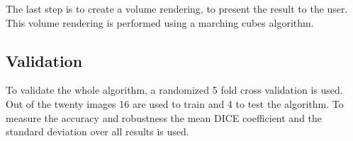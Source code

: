 The last step is to create a volume rendering, to present the result to the user. This volume rendering is performed using a marching cubes algorithm.
\subsection{Validation}
To validate the whole algorithm, a randomized 5 fold cross validation is used. Out of the twenty images 16 are used to train and 4 to test the algorithm. To measure the accuracy and robustness the mean DICE coefficient and the standard deviation over all results is used.
